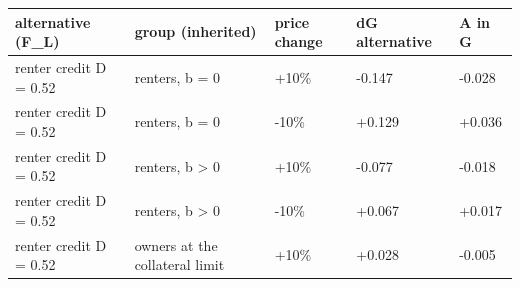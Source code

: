 \begingroup\small
\setlength{\tabcolsep}{3pt}
\renewcommand{\arraystretch}{1.04}
\begin{tabularx}{\linewidth}{XXXXX}
\toprule
alternative (F\_L) & group (inherited) & price change & dG alternative & A in G \\
\midrule
renter credit D = 0.52 & renters, b = 0 & +10\% & -0.147 & -0.028 \\
renter credit D = 0.52 & renters, b = 0 & -10\% & +0.129 & +0.036 \\
renter credit D = 0.52 & renters, b \textgreater{} 0 & +10\% & -0.077 & -0.018 \\
renter credit D = 0.52 & renters, b \textgreater{} 0 & -10\% & +0.067 & +0.017 \\
renter credit D = 0.52 & owners at the collateral limit & +10\% & +0.028 & -0.005 \\
\bottomrule
\end{tabularx}
\endgroup
